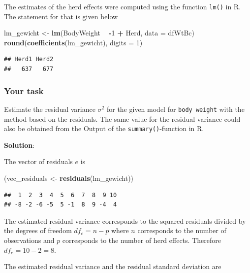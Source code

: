 \documentclass[]{article}
\newenvironment{Shaded}{\begin{snugshade}}{\end{snugshade}}
\newcommand{\KeywordTok}[1]{\textcolor[rgb]{0.13,0.29,0.53}{\textbf{#1}}}
\newcommand{\DataTypeTok}[1]{\textcolor[rgb]{0.13,0.29,0.53}{#1}}
\newcommand{\DecValTok}[1]{\textcolor[rgb]{0.00,0.00,0.81}{#1}}
\newcommand{\StringTok}[1]{\textcolor[rgb]{0.31,0.60,0.02}{#1}}
\newcommand{\OperatorTok}[1]{\textcolor[rgb]{0.81,0.36,0.00}{\textbf{#1}}}
\newcommand{\NormalTok}[1]{#1}
\newcommand{\sol}
{\vspace{2ex}\textbf{Solution}:}
\begin{document}
The estimates of the herd effects were computed using the function
\texttt{lm()} in R. The statement for that is given below

\begin{Shaded}
\begin{Highlighting}[]
\NormalTok{lm_gewicht <-}\StringTok{ }\KeywordTok{lm}\NormalTok{(BodyWeight }\OperatorTok{~}\StringTok{ }\OperatorTok{-}\DecValTok{1} \OperatorTok{+}\StringTok{ }\NormalTok{Herd, }\DataTypeTok{data =}\NormalTok{ dfWtBc)}
\KeywordTok{round}\NormalTok{(}\KeywordTok{coefficients}\NormalTok{(lm_gewicht), }\DataTypeTok{digits =} \DecValTok{1}\NormalTok{)}
\end{Highlighting}
\end{Shaded}

\begin{verbatim}
## Herd1 Herd2 
##   637   677
\end{verbatim}

\subsubsection{Your task}\label{your-task}

Estimate the residual variance \(\sigma^2\) for the given model for
\texttt{body\ weight} with the method based on the residuals. The same
value for the residual variance could also be obtained from the Output
of the \texttt{summary()}-function in R.

\sol

The vector of residuals \(e\) is

\begin{Shaded}
\begin{Highlighting}[]
\NormalTok{(vec_residuals <-}\StringTok{ }\KeywordTok{residuals}\NormalTok{(lm_gewicht))}
\end{Highlighting}
\end{Shaded}

\begin{verbatim}
##  1  2  3  4  5  6  7  8  9 10 
## -8 -2 -6 -5  5 -1  8  9 -4  4
\end{verbatim}

The estimated residual variance corresponds to the squared residuals
divided by the degrees of freedom \(df_e = n - p\) where \(n\)
corresponds to the number of observations and \(p\) corresponds to the
number of herd effects. Therefore \(df_e = 10 - 2 = 8\).

The estimated residual variance and the residual standard deviation are
\end{document}
